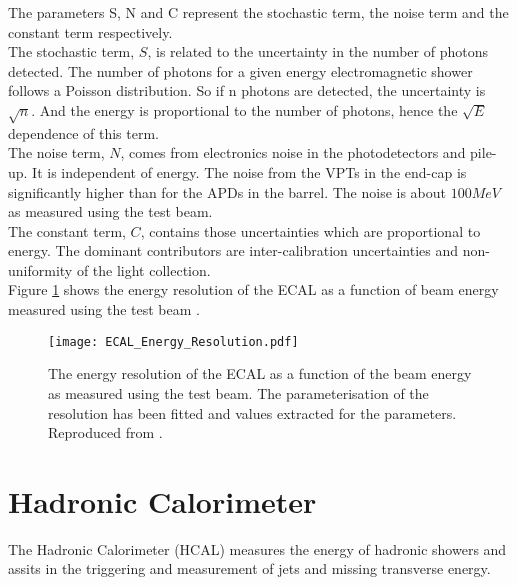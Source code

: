 The parameters S, N and C represent the stochastic term, the noise term and the
constant term respectively. \\

The stochastic term, $S$, is related to the uncertainty in the number of photons 
detected. The number of photons for a given energy electromagnetic shower 
follows a Poisson distribution. So if n photons are detected, the uncertainty is 
$\sqrt{n}$. And the energy is proportional to the number of photons, hence the 
$\sqrt{E}$ dependence of this term. \\

The noise term, $N$, comes from electronics noise in the photodetectors and
pile-up. It is independent of energy. The noise from the VPTs in the end-cap is
significantly higher than for the APDs in the barrel. The noise is about 
$100\unit{MeV}$ as measured using the test beam. \\

The constant term, $C$, contains those uncertainties which are proportional to
energy. The dominant contributors are inter-calibration uncertainties and
non-uniformity of the light collection. \\

Figure \ref{fig:ECAL_Energy_Resolution} shows the energy resolution of the ECAL
as a function of beam energy measured using the test beam \cite{test_beam}.

\begin{figure}
\begin{center}
\texttt{[image: ECAL\_Energy\_Resolution.pdf]}
\end{center}
\caption{The energy resolution of the ECAL as a function of the beam energy as
measured using the test beam. The parameterisation of the resolution has been 
fitted and values extracted for the parameters. Reproduced from
\cite{test_beam}.}
\label{fig:ECAL_Energy_Resolution}
\end{figure}

\section{Hadronic Calorimeter}

The Hadronic Calorimeter (HCAL) measures the energy of hadronic showers and
assits in the triggering and measurement of jets and missing transverse energy.
\\

